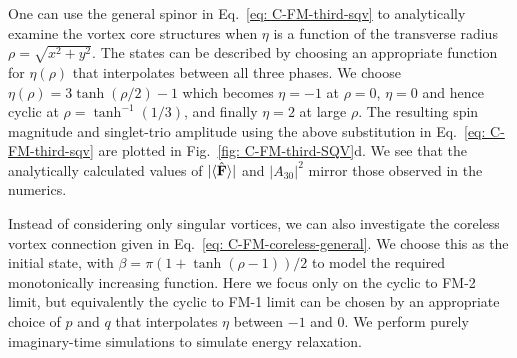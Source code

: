One can use the general spinor in Eq.~\eqref{eq: C-FM-third-sqv} to
analytically examine the vortex core structures when \(\eta \) is a
function of the transverse radius \(\rho = \sqrt{x^2 + y^2}\).
The states can be described by choosing an appropriate function for
\(\eta(\rho)\) that interpolates between all three phases.
We choose \(\eta(\rho) = 3\tanh(\rho/2) - 1\) which becomes \(\eta=-1\) at
\(\rho=0\), \(\eta=0\) and hence cyclic at \(\rho=\tanh^{-1}(1/3)\), and
finally \(\eta=2\) at large \(\rho \).
The resulting spin magnitude and singlet-trio amplitude using the above
substitution in Eq.~\eqref{eq: C-FM-third-sqv} are plotted in
Fig.~\ref{fig: C-FM-third-SQV}d.
We see that the analytically calculated values of \(|\langle \hat{\vb{F}} \rangle | \) and
\(|A_{30}|^2\) mirror those observed in the numerics.

Instead of considering only singular vortices, we can also investigate the
coreless vortex connection given in Eq.~\eqref{eq: C-FM-coreless-general}.
We choose this as the initial state, with
\(\beta = \pi\left(1 + \tanh(\rho-1)\right)/2\) to model the required
monotonically increasing function.
Here we focus only on the cyclic to FM-2 limit, but equivalently the cyclic to
FM-1 limit can be chosen by an appropriate choice of \(p\) and \(q\) that
interpolates \(\eta \) between \(-1\) and \(0\).
We perform purely imaginary-time simulations to simulate energy relaxation.
